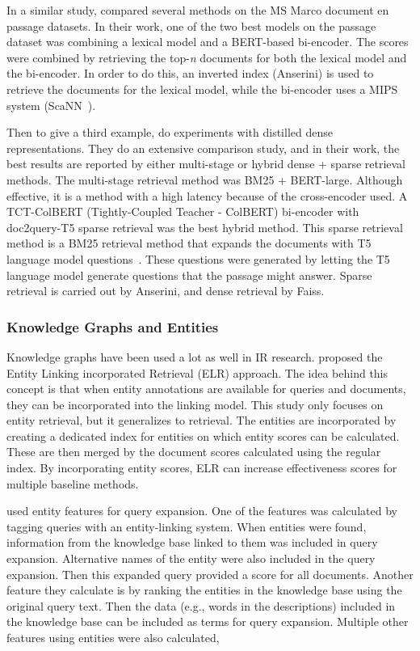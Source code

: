 In a similar study, \citet{dense-retrieval-2} compared several methods on the MS Marco document en passage datasets. In their work, one of the two best models on the passage dataset was combining a lexical model and a BERT-based bi-encoder. The scores were combined by retrieving the top-\textit{n} documents for both the lexical model and the bi-encoder. In order to do this, an inverted index (Anserini) is used to retrieve the documents for the lexical model, while the bi-encoder uses a MIPS system (ScaNN~\citep{scann}).

Then to give a third example, \citet{dense-retrieval-3} do experiments with distilled dense representations. They do an extensive comparison study, and in their work, the best results are reported by either multi-stage or hybrid dense + sparse retrieval methods. The multi-stage retrieval method was BM25 + BERT-large. Although effective, it is a method with a high latency because of the cross-encoder used. A TCT-ColBERT (Tightly-Coupled Teacher - ColBERT) bi-encoder with doc2query-T5 sparse retrieval was the best hybrid method. This sparse retrieval method is a BM25 retrieval method that expands the documents with T5 language model questions~\citep{2020t5}. These questions were generated by letting the T5 language model generate questions that the passage might answer. Sparse retrieval is carried out by Anserini, and dense retrieval by Faiss. 

\subsubsection{Knowledge Graphs and Entities}
Knowledge graphs have been used a lot as well in IR research.  proposed the Entity Linking incorporated Retrieval (ELR) approach. The idea behind this concept is that when entity annotations are available for queries and documents, they can be incorporated into the linking model. This study only focuses on entity retrieval, but it generalizes to retrieval. The entities are incorporated by creating a dedicated index for entities on which entity scores can be calculated. These are then merged by the document scores calculated using the regular index. By incorporating entity scores, ELR can increase effectiveness scores for multiple baseline methods. 

 used entity features for query expansion. One of the features was calculated by tagging queries with an entity-linking system. When entities were found, information from the knowledge base linked to them was included in query expansion. Alternative names of the entity were also included in the query expansion. Then this expanded query provided a score for all documents. Another feature they calculate is by ranking the entities in the knowledge base using the original query text. Then the data (e.g., words in the descriptions) included in the knowledge base can be included as terms for query expansion. Multiple other features using entities were also calculated, 

